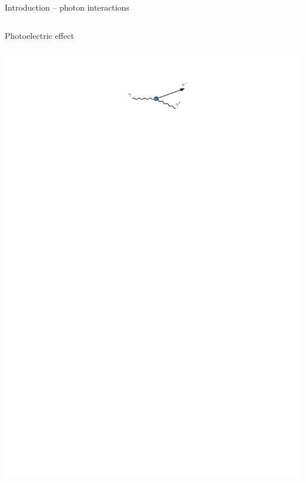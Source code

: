 \documentclass[11pt,xcolor=dvipsnames,professionalfonts]{beamer}
\begin{document}
\begin{frame}{Introduction -- photon interactions}
\begin{columns}
			Photoelectric effect
	\end{columns}
	\vspace{-0.2cm}
	\begin{columns}
		\begin{center}
			\includegraphics{./figures/compton_intro.pdf}
		\end{center}
		

\end{columns}
\end{frame}
\end{document}
